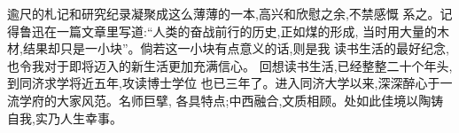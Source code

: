 \begin{acknowledge}
逾尺的札记和研究纪录凝聚成这么薄薄的一本,高兴和欣慰之余,不禁感慨 系之。记得鲁迅在一篇文章里写道:“人类的奋战前行的历史,正如煤的形成, 当时用大量的木材,结果却只是一小块”。倘若这一小块有点意义的话,则是我 读书生活的最好纪念,也令我对于即将迈入的新生活更加充满信心。
回想读书生活,已经整整二十个年头,到同济求学将近五年,攻读博士学位 也已三年了。进入同济大学以来,深深醉心于一流学府的大家风范。名师巨擘, 各具特点;中西融合,文质相顾。处如此佳境以陶铸自我,实乃人生幸事。
\end{acknowledge}
